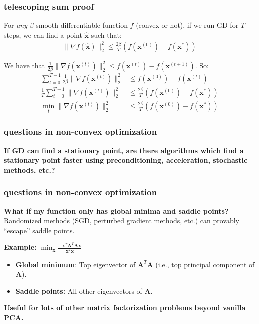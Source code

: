 \documentclass[compress]{beamer}
\newcommand{\bv}[1]{\mathbf{#1}}
\begin{document}
\begin{frame}[t]
	\frametitle{telescoping sum proof}
	\begin{theorem}
		For \emph{any} $\beta$-smooth differentiable function $f$ (convex or not), if we run GD for $T$ steps, we can find a point $\hat{\bv{x}}$ such that:
		\begin{align*}
			\|\nabla f(\hat{\bv{x}})\|_2^2 \leq  \frac{2\beta}{T} \left( f(\bv{x}^{(0)}) -  f(\bv{x}^{*})\right) 
		\end{align*} 
	\end{theorem}
We have that $\frac{1}{2\beta}\|\nabla f(\bv{x}^{(t)})\|_2^2 \leq f(\bv{x}^{(t)}) - f(\bv{x}^{(t+1)}).$ So: 
\begin{align*}
	\sum_{t=0}^{T-1}\frac{1}{2\beta}\|\nabla f(\bv{x}^{(t)})\|_2^2 &\leq f(\bv{x}^{(0)}) -  f(\bv{x}^{(t)})\\
	\frac{1}{T}\sum_{t=0}^{T-1}\|\nabla f(\bv{x}^{(t)})\|_2^2 &\leq \frac{2\beta}{T} \left( f(\bv{x}^{(0)}) -  f(\bv{x}^{*})\right)\\
	\min_t \|\nabla f(\bv{x}^{(t)})\|_2^2 &\leq \frac{2\beta}{T} \left( f(\bv{x}^{(0)}) -  f(\bv{x}^{*})\right)
\end{align*}
\end{frame}

\begin{frame}[t]
	\frametitle{questions in non-convex optimization}
	\textbf{If GD can find a stationary point, are there algorithms which find a stationary point faster using preconditioning, acceleration, stochastic methods, etc.?}
\end{frame}

\begin{frame}[t]
	\frametitle{questions in non-convex optimization}
	\textbf{What if my function only has global minima and saddle points?}
	Randomized methods (SGD, perturbed gradient methods, etc.) can provably ``escape'' saddle points.
	\vspace{1em}
	
	
	\textbf{Example:} $\min_{\bv{x}} \frac{-\bv{x}^T\bv{A}^T\bv{A}\bv{x}}{\bv{x}^T\bv{x}}$
	\begin{itemize}
		\item \textbf{Global minimum}: Top eigenvector of $\bv{A}^T\bv{A}$ (i.e., top principal component of $\bv{A}$).
		\item \textbf{Saddle points:} All other eigenvectors of $\bv{A}$. 
	\end{itemize}
	\begin{center}
		\alert{\textbf{Useful for lots of other matrix factorization problems beyond vanilla PCA.}}
	\end{center}
\end{frame}
\end{document}
